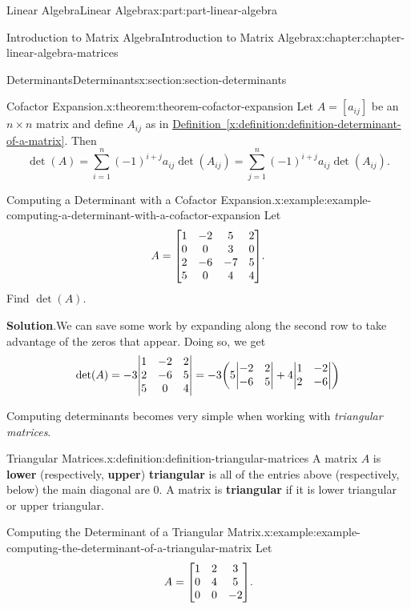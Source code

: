 \documentclass[twoside,10pt,]{book}
\newcommand{\blocktitlefont}{\relax}
\newcommand{\xreffont}{\relax}
\newcommand{\terminology}[1]{\textbf{#1}}
\numberwithin{equation}{part}
\begin{document}
\begin{partptx}{Linear Algebra}{}{Linear Algebra}{}{}{x:part:part-linear-algebra}
\begin{chapterptx}{Introduction to Matrix Algebra}{}{Introduction to Matrix Algebra}{}{}{x:chapter:chapter-linear-algebra-matrices}
\begin{sectionptx}{Determinants}{}{Determinants}{}{}{x:section:section-determinants}
\begin{theorem}{Cofactor Expansion.}{}{x:theorem:theorem-cofactor-expansion}
Let \(A=[a_{ij}]\) be an \(n\times n\) matrix and define \(A_{ij}\) as in \hyperref[x:definition:definition-determinant-of-a-matrix]{Definition~{\xreffont\ref{x:definition:definition-determinant-of-a-matrix}}}. Then%
\begin{equation*}
\det(A) = \sum_{i=1}^{n}(-1)^{i+j}a_{ij}\det(A_{ij}) = \sum_{j=1}^{n}(-1)^{i+j}a_{ij}\det(A_{ij}).
\end{equation*}
%
\end{theorem}
\begin{example}{Computing a Determinant with a Cofactor Expansion.}{x:example:example-computing-a-determinant-with-a-cofactor-expansion}%
Let%
\begin{equation*}
A = \mqty[1 & -2 & 5 & 2 \\ 0 & 0 & 3 & 0 \\ 2 & -6 & -7 & 5 \\ 5 & 0 & 4 & 4].
\end{equation*}
Find \(\det(A)\).%
\par\smallskip%
\noindent\textbf{\blocktitlefont Solution}.\hypertarget{g:solution:idm1650306584}{}\quad{}We can save some work by expanding along the second row to take advantage of the zeros that appear. Doing so, we get%
\begin{equation*}
\det(A) = -3\mqty|1 & -2 & 2 \\ 2 & -6 & 5 \\ 5 & 0 & 4| = -3\qty(5\mqty|-2 & 2\\ -6 & 5| + 4\mqty|1 & -2 \\ 2 & -6|)
\end{equation*}
%
\end{example}
Computing determinants becomes very simple when working with \emph{triangular matrices}.%
\begin{definition}{Triangular Matrices.}{x:definition:definition-triangular-matrices}%
A matrix \(A\) is \terminology{lower} (respectively, \terminology{upper}) \terminology{triangular} is all of the entries above (respectively, below) the main diagonal are \(0\). A matrix is \terminology{triangular} if it is lower triangular or upper triangular.%
\end{definition}
\begin{example}{Computing the Determinant of a Triangular Matrix.}{x:example:example-computing-the-determinant-of-a-triangular-matrix}%
Let%
\begin{equation*}
A = \mqty[1 & 2 & 3 \\ 0 & 4 & 5 \\ 0 & 0 & -2].

\end{equation*}
\end{example}
\end{sectionptx}
\end{chapterptx}
\end{partptx}
\end{document}
